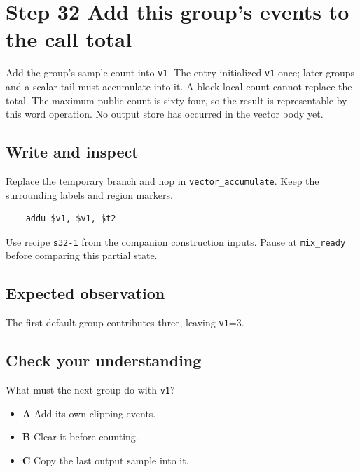 \section{Step 32 Add this group’s events to the call total}\label{pcm-s32}

Add the group’s sample count into \texttt{v1}. The entry initialized \texttt{v1} once; later groups and a scalar tail must accumulate into it. A block-local count cannot replace the total. The maximum public count is sixty-four, so the result is representable by this word operation. No output store has occurred in the vector body yet.

\subsection{Write and inspect}
Replace the temporary branch and nop in \texttt{vector\_accumulate}. Keep the surrounding labels and region markers.

\begin{verbatim}
    addu $v1, $v1, $t2
\end{verbatim}
Use recipe \texttt{s32-1} from the companion construction inputs. Pause at \texttt{mix\_ready} before comparing this partial state.

\subsection{Expected observation}
The first default group contributes three, leaving \texttt{v1}=3.

\subsection{Check your understanding}
What must the next group do with \texttt{v1}?

\begin{itemize}
\item \textbf{A} Add its own clipping events.
\item \textbf{B} Clear it before counting.
\item \textbf{C} Copy the last output sample into it.
\end{itemize}
